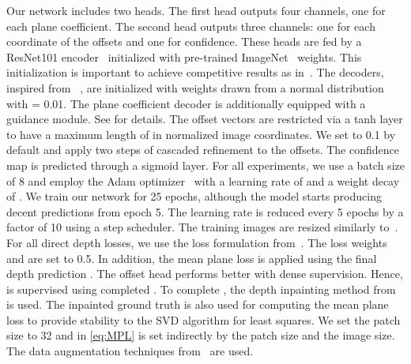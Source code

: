 \documentclass[final]{cvpr}
\newcommand{\PAR}[1]{\vskip2pt \noindent{\bf #1}}
\begin{document}
\PAR{Implementation details.} Our network includes two heads. The first head outputs four channels, one for each plane coefficient. The second head outputs three channels: one for each coordinate of the offsets and one for confidence. These heads are fed by a ResNet101 encoder~\cite{resnet} initialized with pre-trained ImageNet~\cite{imagenet} weights. This initialization is important to achieve competitive results as in~\cite{local:planar:guidance,depth:attention:volume,virtual:normal:depth,depth:ordinal:cvpr:2018}. The decoders, inspired from ~\cite{decoders}, are initialized with weights drawn from a normal distribution with = 0.01. The plane coefficient decoder is additionally equipped with a guidance module. See  for details.
The offset vectors are restricted via a tanh layer to have a maximum length of  in normalized image coordinates. We set  to 0.1 by default and apply two steps of cascaded refinement to the offsets. The confidence map is predicted through a sigmoid layer. For all experiments, we use a batch size of 8 and employ the Adam optimizer~\cite{adam} with a learning rate of  and a weight decay of . We train our network for 25 epochs, although the model starts producing decent predictions from epoch 5. The learning rate is reduced every 5 epochs by a factor of 10 using a step scheduler. The training images are resized similarly to~\cite{local:planar:guidance}. For all direct depth losses, we use the loss formulation from~\cite{depth:multiscale:network}. The loss weights  and  are set to 0.5. In addition, the mean plane loss is applied using the final depth prediction . The offset head performs better with dense supervision. Hence,  is supervised using completed . To complete , the depth inpainting method from~\cite{nyu} is used. The inpainted ground truth is also used for computing the mean plane loss to provide stability to the SVD algorithm for least squares. We set the patch size to 32 and  in \eqref{eq:MPL} is set indirectly by the patch size and the image size.
The data augmentation techniques from~\cite{local:planar:guidance} are used.
\end{document}
